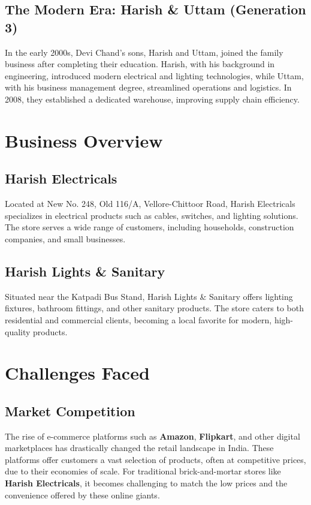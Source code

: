 \documentclass[a4paper,12pt]{report}
\begin{document}
\section{The Modern Era: Harish \& Uttam (Generation 3)}
In the early 2000s, Devi Chand's sons, Harish and Uttam, joined the family business after completing their education. Harish, with his background in engineering, introduced modern electrical and lighting technologies, while Uttam, with his business management degree, streamlined operations and logistics. In 2008, they established a dedicated warehouse, improving supply chain efficiency.

\chapter{Business Overview}

\section{Harish Electricals}
Located at New No. 248, Old 116/A, Vellore-Chittoor Road, Harish Electricals specializes in electrical products such as cables, switches, and lighting solutions. The store serves a wide range of customers, including households, construction companies, and small businesses.

\section{Harish Lights \& Sanitary}
Situated near the Katpadi Bus Stand, Harish Lights \& Sanitary offers lighting fixtures, bathroom fittings, and other sanitary products. The store caters to both residential and commercial clients, becoming a local favorite for modern, high-quality products.



\chapter{Challenges Faced}

\section{Market Competition}
The rise of e-commerce platforms such as \textbf{Amazon}, \textbf{Flipkart}, and other digital marketplaces has drastically changed the retail landscape in India. These platforms offer customers a vast selection of products, often at competitive prices, due to their economies of scale. For traditional brick-and-mortar stores like \textbf{Harish Electricals}, it becomes challenging to match the low prices and the convenience offered by these online giants.
\end{document}
